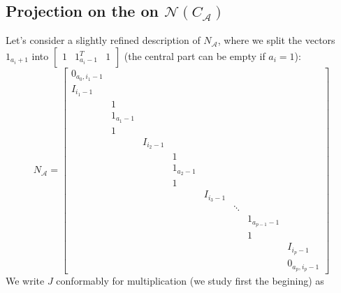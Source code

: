 \documentclass[]{article}
\newcommand{\BIN}{\begin{bmatrix}}
\newcommand{\BOUT}{\end{bmatrix}}
\begin{document}
\subsection{Projection on the on $\mathcal{N}(C_\mathcal{A})$}
Let's consider a slightly refined description of $N_\mathcal{A}$, where we split the vectors $1_{a_i+1}$ into $\BIN 1 & 1_{a_i-1}^T & 1\BOUT$ (the central part can be empty if $a_i = 1$):
\begin{equation}
  N_{\mathcal{A}} = \BIN 
    0_{a_0,i_1-1} & & & & & & & \\
    I_{i_1-1} & & & & & & &\\
    & 1 & & & & & &\\
    & 1_{a_1-1} & & & & & &\\
    & 1 & & & & & &\\
    && I_{i_2-1} & & & & &\\
    &&& 1 & & & &\\
    &&& 1_{a_2-1} & & & & \\
    &&& 1 & & & &\\
    &&&& I_{i_3-1} & & & \\
    &&&&&\ddots & & \\
    &&&&&& 1_{a_{p-1}-1} & \\
    &&&&&& 1 & \\
    &&&&&&& I_{i_p-1} \\
    &&&&&&& 0_{a_p,i_p-1}
  \BOUT
\end{equation}
We write $J$ conformably for multiplication (we study first the begining) as
\end{document}
